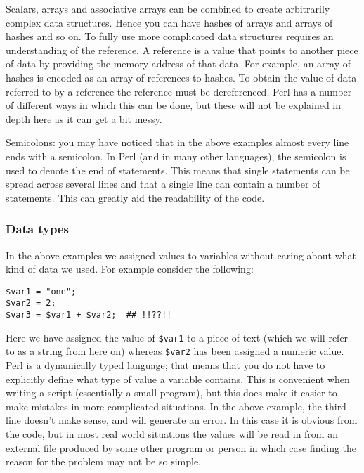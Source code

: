 \documentclass[11pt]{article}
\begin{document}
Scalars, arrays and associative arrays can be combined to create
arbitrarily complex data structures. Hence you can have hashes of arrays
and arrays of hashes and so on. To fully use more complicated data
structures requires an understanding of the reference. A reference is a
value that points to another piece of data by providing the memory
address of that data. For example, an array of hashes is encoded as an
array of references to hashes. To obtain the value of data referred to
by a reference the reference must be dereferenced. Perl has
a number of different ways in which this can be done, but these will not
be explained in depth here as it can get a bit messy. 

Semicolons: you may have noticed that in the above examples almost every
line ends with a semicolon. In Perl (and in many other languages), the
semicolon is used to denote the end of statements. This means
that single statements can be spread across several lines and that a
single line can contain a number of statements. This can greatly aid the
readability of the code.

\subsubsection{Data types}
\label{sec-5-0-3}

In the above examples we assigned values to variables without caring
about what kind of data we used. For example consider the following:

\begin{verbatim}
$var1 = "one";
$var2 = 2;
$var3 = $var1 + $var2;  ## !!??!!
\end{verbatim}

Here we have assigned the value of \texttt{\$var1} to a piece of text (which we
will refer to as a string from here on) whereas \texttt{\$var2} has been
assigned a numeric value. Perl is a dynamically typed language; that
means that you do not have to explicitly define what type of value a
variable contains. This is convenient when writing a script (essentially
a small program), but this does make it easier to make mistakes in more
complicated situations. In the above example, the third line doesn't
make sense, and will generate an error. In this case it is obvious from
the code, but in most real world situations the values will be read in
from an external file produced by some other program or person in which
case finding the reason for the problem may not be so simple.
\end{document}
